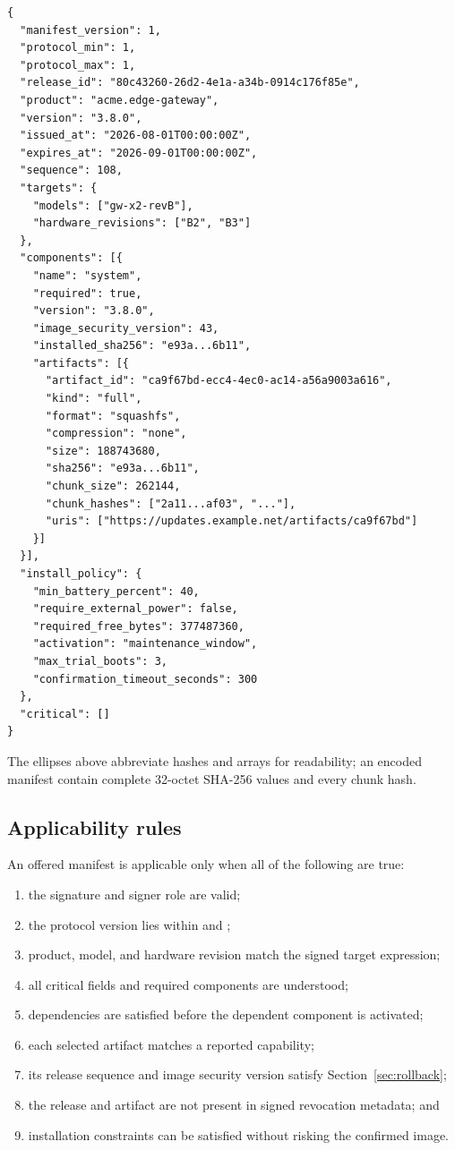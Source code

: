 \begin{lstlisting}[language={},caption={Abbreviated diagnostic manifest representation}]
{
  "manifest_version": 1,
  "protocol_min": 1,
  "protocol_max": 1,
  "release_id": "80c43260-26d2-4e1a-a34b-0914c176f85e",
  "product": "acme.edge-gateway",
  "version": "3.8.0",
  "issued_at": "2026-08-01T00:00:00Z",
  "expires_at": "2026-09-01T00:00:00Z",
  "sequence": 108,
  "targets": {
    "models": ["gw-x2-revB"],
    "hardware_revisions": ["B2", "B3"]
  },
  "components": [{
    "name": "system",
    "required": true,
    "version": "3.8.0",
    "image_security_version": 43,
    "installed_sha256": "e93a...6b11",
    "artifacts": [{
      "artifact_id": "ca9f67bd-ecc4-4ec0-ac14-a56a9003a616",
      "kind": "full",
      "format": "squashfs",
      "compression": "none",
      "size": 188743680,
      "sha256": "e93a...6b11",
      "chunk_size": 262144,
      "chunk_hashes": ["2a11...af03", "..."],
      "uris": ["https://updates.example.net/artifacts/ca9f67bd"]
    }]
  }],
  "install_policy": {
    "min_battery_percent": 40,
    "require_external_power": false,
    "required_free_bytes": 377487360,
    "activation": "maintenance_window",
    "max_trial_boots": 3,
    "confirmation_timeout_seconds": 300
  },
  "critical": []
}
\end{lstlisting}

The ellipses above abbreviate hashes and arrays for readability; an encoded
manifest \must contain complete 32-octet SHA-256 values and every chunk hash.

\subsection{Applicability rules}

An offered manifest is applicable only when all of the following are true:

\begin{enumerate}
  \item the signature and signer role are valid;
  \item the protocol version lies within  and
        ;
  \item product, model, and hardware revision match the signed target expression;
  \item all critical fields and required components are understood;
  \item dependencies are satisfied before the dependent component is activated;
  \item each selected artifact matches a reported capability;
  \item its release sequence and image security version satisfy Section~\ref{sec:rollback};
  \item the release and artifact are not present in signed revocation metadata; and
  \item installation constraints can be satisfied without risking the confirmed image.
\end{enumerate}

